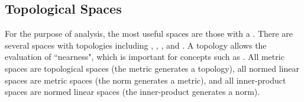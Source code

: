\subsection{Topological Spaces}
For the purpose of analysis, the most useful spaces are those with a .
There are several spaces with topologies including
, , ,
and .
A topology allows the evaluation of ``nearness", which is important for
concepts such as .
All metric spaces are topological spaces (the metric generates a topology),
all normed linear spaces are metric spaces (the norm generates a metric),
and all inner-product spaces are normed linear spaces (the inner-product
generates a norm).

